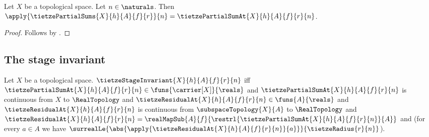 \begin{proposition}\label{tietze_partial_sums_apply}
    Let $X$ be a topological space.
    Let $n\in\naturals$.
    Then
        $\apply{\tietzePartialSums{X}{h}{A}{f}{r}}{n}
            =\tietzePartialSumAt{X}{h}{A}{f}{r}{n}$.
\end{proposition}
\begin{proof}
    Follows by
        .
\end{proof}

\subsection{The stage invariant}

\begin{definition}\label{tietze_stage_invariant_def}
    Let $X$ be a topological space.
    $\tietzeStageInvariant{X}{h}{A}{f}{r}{n}$ iff
        $\tietzePartialSumAt{X}{h}{A}{f}{r}{n}
            \in\funs{\carrier[X]}{\reals}$ and
        $\tietzePartialSumAt{X}{h}{A}{f}{r}{n}$ is continuous from
            $X$ to $\RealTopology$ and
        $\tietzeResidualAt{X}{h}{A}{f}{r}{n}\in\funs{A}{\reals}$ and
        $\tietzeResidualAt{X}{h}{A}{f}{r}{n}$ is continuous from
            $\subspaceTopology{X}{A}$ to $\RealTopology$ and
        $\tietzeResidualAt{X}{h}{A}{f}{r}{n}
            =\realMapSub{A}{f}
                {\restrl{\tietzePartialSumAt{X}{h}{A}{f}{r}{n}}{A}}$
        and
        (for every $a\in A$ we have
            $\surrealLe{
                \abs{\apply{\tietzeResidualAt{X}{h}{A}{f}{r}{n}}{a}}}
                {\tietzeRadius{r}{n}}$).
\end{definition}


